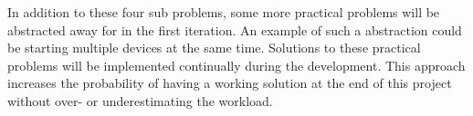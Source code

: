 In addition to these four sub problems, some more practical problems will be abstracted away for in the first iteration.
An example of such a abstraction could be starting multiple devices at the same time.
Solutions to these practical problems will be implemented continually during the development. 
This approach increases the probability of having a working solution at the end of this project without over- or underestimating the workload. 
